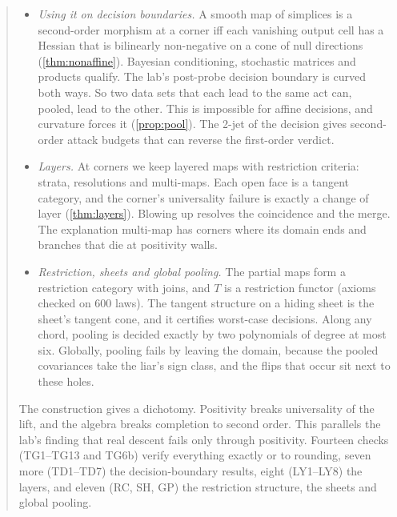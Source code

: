 \documentclass[11pt]{article}
\theoremstyle{definition}\newtheorem{definition}[theorem]{Definition}\newtheorem{remark}[theorem]{Remark}\newtheorem{example}[theorem]{Example}
\begin{document}
\begin{abstract}
\begin{itemize}
  singular points. What fails instead is completing a pair in $T_2V$ to a point of $T^2V$. The obstruction is the class
  $[H(u,v)]\in\operatorname{coker}J$. It vanishes off the two-coincidence stratum, and on it it has norm $|q(u,v)|/\sqrt2$ for an
  explicit quadric $q$. Its diagonal is twice the André--Quillen obstruction of the lab's Theorem G(4), so that obstruction is now a
  statement about $T^2$.
\item \emph{Using it on decision boundaries.} A smooth map of simplices is a second-order morphism at a corner iff each vanishing
  output cell has a Hessian that is bilinearly non-negative on a cone of null directions (\cref{thm:nonaffine}). Bayesian conditioning,
  stochastic matrices and products qualify. The lab's post-probe decision boundary is curved both ways. So two data sets that each lead
  to the same act can, pooled, lead to the other. This is impossible for affine decisions, and curvature forces it
  (\cref{prop:pool}). The 2-jet of the decision gives second-order attack budgets that can reverse the first-order verdict.
\item \emph{Layers.} At corners we keep layered maps with restriction criteria: strata, resolutions and multi-maps. Each open face is a
  tangent category, and the corner's universality failure is exactly a change of layer (\cref{thm:layers}). Blowing up resolves the
  coincidence and the merge. The explanation multi-map has corners where its domain ends and branches that die at positivity walls.
\item \emph{Restriction, sheets and global pooling.} The partial maps form a restriction category with joins, and $T$ is a restriction
  functor (axioms checked on $600$ laws). The tangent structure on a hiding sheet is the sheet's tangent cone, and it certifies worst-case
  decisions. Along any chord, pooling is decided exactly by two polynomials of degree at most six. Globally, pooling fails by leaving the
  domain, because the pooled covariances take the liar's sign class, and the flips that occur sit next to these holes.
\end{itemize}
The construction gives a dichotomy. Positivity breaks universality of the lift, and the algebra breaks completion to second order. This
parallels the lab's finding that real descent fails only through positivity. Fourteen checks (TG1--TG13 and TG6b) verify everything
exactly or to rounding, seven more (TD1--TD7) the decision-boundary results, eight (LY1--LY8) the layers, and eleven (RC, SH, GP) the restriction structure,
the sheets and global pooling.
\end{abstract}
\end{document}
